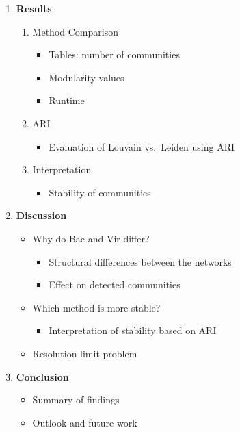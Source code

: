 \documentclass[12pt,a4paper]{article}
\begin{document}
\begin{enumerate}
\begin{enumerate}
\begin{itemize}
\end{itemize}

\end{enumerate}


\item \textbf{Results}
\begin{enumerate}
  \item Method Comparison
  \begin{itemize}
    \item Tables: number of communities
    \item Modularity values
    \item Runtime
  \end{itemize}

  \item ARI
   \begin{itemize}
    \item Evaluation of Louvain vs.\ Leiden using ARI
 
  \end{itemize}

  \item Interpretation
  \begin{itemize}
    \item Stability of communities
  \end{itemize}
\end{enumerate}

\item \textbf{Discussion}
\begin{itemize}
    \item Why do Bac and Vir differ?
    \begin{itemize}
        \item Structural differences between the networks
        \item Effect on detected communities
    \end{itemize}
    \item Which method is more stable?
    \begin{itemize}
        \item Interpretation of stability based on ARI
    \end{itemize}
    \item Resolution limit problem
\end{itemize}

\item \textbf{Conclusion}
\begin{itemize}
  \item Summary of findings
  \item Outlook and future work
\end{itemize}
\end{enumerate}
\end{document}
